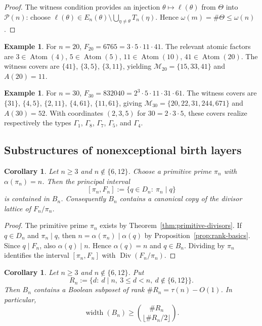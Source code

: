 \documentclass[11pt,letterpaper]{article}
\numberwithin{equation}{section}
\theoremstyle{plain}
\newtheorem{corollary}[theorem]{Corollary}
\theoremstyle{definition}
\newtheorem{example}[theorem]{Example}
\theoremstyle{remark}
\DeclareMathOperator{\Atom}{Atom}
\DeclareMathOperator{\widthop}{width}
\begin{document}
\begin{proof}
The witness condition provides an injection
$\theta\mapsto\ell(\theta)$ from $\Theta$ into $\mathcal P(n)$: choose
$\ell(\theta)\in E_n(\theta)\setminus\bigcup_{\eta\neq\theta}T_n(\eta)$.
Hence $\omega(m)=\#\Theta\le\omega(n)$.
\end{proof}

\begin{example}\label{ex:n20}
For $n=20$, $F_{20}=6765=3\cdot 5\cdot 11\cdot 41$. The relevant atomic
factors are $3\in\Atom(4)$, $5\in\Atom(5)$, $11\in\Atom(10)$,
$41\in\Atom(20)$. The witness covers are $\{41\}$, $\{3,5\}$, $\{3,11\}$,
yielding $\mathcal M_{20}=\{15,33,41\}$ and $A(20)=11$.
\end{example}

\begin{example}\label{ex:n30}
For $n=30$, $F_{30}=832040=2^3\cdot 5\cdot 11\cdot 31\cdot 61$. The witness
covers are $\{31\}$, $\{4,5\}$, $\{2,11\}$, $\{4,61\}$, $\{11,61\}$, giving
$\mathcal M_{30}=\{20,22,31,244,671\}$ and $A(30)=52$.
With coordinates $(2,3,5)$ for $30=2\cdot3\cdot5$, these covers realize
respectively the types $\Gamma_1$, $\Gamma_8$, $\Gamma_7$, $\Gamma_5$, and
$\Gamma_4$.
\end{example}

\subsection*{Substructures of nonexceptional birth layers}

\begin{corollary}\label{thm:canonical-principal-interval}
Let $n\ge3$ and $n\notin\{6,12\}$. Choose a primitive prime
$\pi_n$ with $\alpha(\pi_n)=n$. Then the principal interval
\[
[\pi_n,F_n]:=\{q\in D_n:\ \pi_n\mid q\}
\]
is contained in $B_n$. Consequently $B_n$ contains a canonical copy of the
divisor lattice of $F_n/\pi_n$.
\end{corollary}

\begin{proof}
The primitive prime $\pi_n$ exists by Theorem~\ref{thm:primitive-divisors}.
If $q\in D_n$ and $\pi_n\mid q$, then
$n=\alpha(\pi_n)\mid\alpha(q)$ by Proposition~\ref{prop:rank-basics}. Since
$q\mid F_n$, also $\alpha(q)\mid n$. Hence $\alpha(q)=n$ and $q\in B_n$.
Dividing by $\pi_n$ identifies the interval $[\pi_n,F_n]$ with
$\operatorname{Div}(F_n/\pi_n)$.
\end{proof}

\begin{corollary}\label{thm:boolean-skeleton}
Let $n\ge3$ and $n\notin\{6,12\}$. Put
\[
R_n:=\{d:\ d\mid n,\ 3\le d<n,\ d\notin\{6,12\}\}.
\]
Then $B_n$ contains a Boolean subposet of rank $\#R_n=\tau(n)-O(1)$. In
particular,
\[
\widthop(B_n)\ge \binom{\#R_n}{\lfloor \#R_n/2\rfloor}.
\]
\end{corollary}
\end{document}
